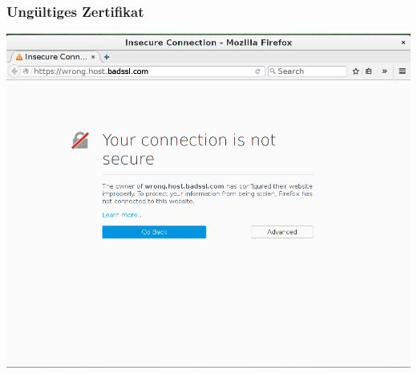 \begin{frame}
    \frametitle{Ungültiges Zertifikat}
    \begin{center}
	\includegraphics[height=0.7\textheight]{../../img/ssl_badcert.png}
    \end{center}
\end{frame}
